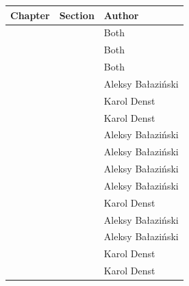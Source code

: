 \begin{table}[h]
    \centering
    \begin{tabular}{|l|l|l|}
        \hline
        Chapter                               & Section                                     & Author            \\ \hline
        \nameref{ch:introduction}             &                                             & Both              \\
        \nameref{sec:division_of_work}        &                                             & Both              \\
        \nameref{ch:functional_specification} &                                             & Both              \\
        \nameref{ch:theoretical_foundations}  & \nameref{sec:non_euclidean_geometry}        & Aleksy Bałaziński \\
        \nameref{ch:theoretical_foundations}  & \nameref{sec:theory_theory_marching_cubes}  & Karol Denst       \\
        \nameref{ch:theoretical_foundations}  & \nameref{sec:theory_theory_models}          & Karol Denst       \\
        \nameref{ch:theoretical_foundations}  & \nameref{sec:theory_theory_day_night_cycle} & Aleksy Bałaziński \\
        \nameref{ch:theoretical_foundations}  & \nameref{sec:theory_theory_lighting}        & Aleksy Bałaziński \\
        \nameref{ch:implementation}           & \nameref{sec:technologies_selection}        & Aleksy Bałaziński \\
        \nameref{ch:implementation}           & \nameref{sec:game_objects_management}       & Aleksy Bałaziński \\
        \nameref{ch:implementation}           & \nameref{sec:implementation_terrain}        & Karol Denst       \\
        \nameref{ch:implementation}           & \nameref{sec:chunk-worker}                  & Aleksy Bałaziński \\
        \nameref{ch:implementation}           & \nameref{sec:implementation_rendering}      & Aleksy Bałaziński \\
        \nameref{ch:implementation}           & \nameref{sec:two_dimensional_graphics}      & Karol Denst       \\
        \nameref{ch:testing}                  &                                             & Karol Denst       \\

\end{tabular}
\end{table}
